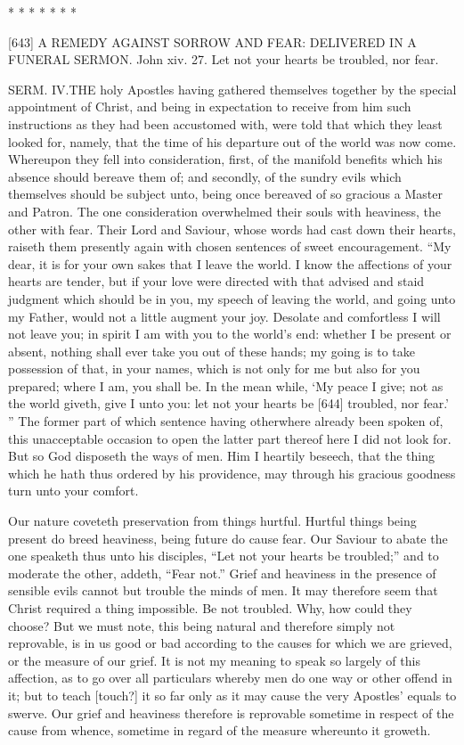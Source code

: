 * * * * * * *

[643]
A REMEDY AGAINST SORROW AND FEAR: DELIVERED IN A FUNERAL SERMON.
John xiv. 27.
Let not your hearts be troubled, nor fear.

SERM. IV.THE holy Apostles having gathered themselves together by the special appointment of Christ, and being in expectation to receive from him such instructions as they had been accustomed with, were told that which they least looked for, namely, that the time of his departure out of the world was now come. Whereupon they fell into consideration, first, of the manifold benefits which his absence should bereave them of; and secondly, of the sundry evils which themselves should be subject unto, being once bereaved of so gracious a Master and Patron. The one consideration overwhelmed their souls with heaviness, the other with fear. Their Lord and Saviour, whose words had cast down their hearts, raiseth them presently again with chosen sentences of sweet encouragement. “My dear, it is for your own sakes that I leave the world. I know the affections of your hearts are tender, but if your love were directed with that advised and staid judgment which should be in you, my speech of leaving the world, and going unto my Father, would not a little augment your joy. Desolate and comfortless I will not leave you; in spirit I am with you to the world’s end: whether I be present or absent, nothing shall ever take you out of these hands; my going is to take possession of that, in your names, which is not only for me but also for you prepared; where I am, you shall be. In the mean while, ‘My peace I give; not as the world giveth, give I unto you: let not your hearts be [644] troubled, nor fear.’ ” The former part of which sentence having otherwhere already been spoken of, this unacceptable occasion to open the latter part thereof here I did not look for. But so God disposeth the ways of men. Him I heartily beseech, that the thing which he hath thus ordered by his providence, may through his gracious goodness turn unto your comfort.

Our nature coveteth preservation from things hurtful. Hurtful things being present do breed heaviness, being future do cause fear. Our Saviour to abate the one speaketh thus unto his disciples, “Let not your hearts be troubled;” and to moderate the other, addeth, “Fear not.” Grief and heaviness in the presence of sensible evils cannot but trouble the minds of men. It may therefore seem that Christ required a thing impossible. Be not troubled. Why, how could they choose? But we must note, this being natural and therefore simply not reprovable, is in us good or bad according to the causes for which we are grieved, or the measure of our grief. It is not my meaning to speak so largely of this affection, as to go over all particulars whereby men do one way or other offend in it; but to teach [touch?] it so far only as it may cause the very Apostles’ equals to swerve. Our grief and heaviness therefore is reprovable sometime in respect of the cause from whence, sometime in regard of the measure whereunto it groweth.

